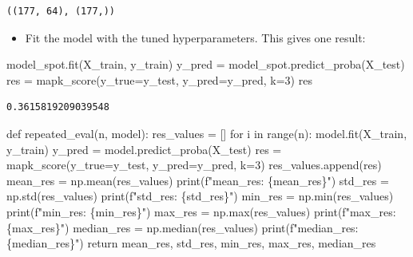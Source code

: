 \documentclass[
  letterpaper,
  DIV=11,
  numbers=noendperiod]{scrreprt}
\newenvironment{Shaded}{\begin{snugshade}}{\end{snugshade}}
\newcommand{\BuiltInTok}[1]{\textcolor[rgb]{0.00,0.23,0.31}{#1}}
\newcommand{\ControlFlowTok}[1]{\textcolor[rgb]{0.00,0.23,0.31}{#1}}
\newcommand{\DecValTok}[1]{\textcolor[rgb]{0.68,0.00,0.00}{#1}}
\newcommand{\KeywordTok}[1]{\textcolor[rgb]{0.00,0.23,0.31}{#1}}
\newcommand{\NormalTok}[1]{\textcolor[rgb]{0.00,0.23,0.31}{#1}}
\newcommand{\OperatorTok}[1]{\textcolor[rgb]{0.37,0.37,0.37}{#1}}
\newcommand{\SpecialCharTok}[1]{\textcolor[rgb]{0.37,0.37,0.37}{#1}}
\newcommand{\SpecialStringTok}[1]{\textcolor[rgb]{0.13,0.47,0.30}{#1}}
\providecommand{\tightlist}{%
  \setlength{\itemsep}{0pt}\setlength{\parskip}{0pt}}\usepackage{longtable,booktabs,array}
\begin{document}
\begin{verbatim}
((177, 64), (177,))
\end{verbatim}

\begin{itemize}
\tightlist
\item
  Fit the model with the tuned hyperparameters. This gives one result:
\end{itemize}

\begin{Shaded}
\begin{Highlighting}[]
\NormalTok{model\_spot.fit(X\_train, y\_train)}
\NormalTok{y\_pred }\OperatorTok{=}\NormalTok{ model\_spot.predict\_proba(X\_test)}
\NormalTok{res }\OperatorTok{=}\NormalTok{ mapk\_score(y\_true}\OperatorTok{=}\NormalTok{y\_test, y\_pred}\OperatorTok{=}\NormalTok{y\_pred, k}\OperatorTok{=}\DecValTok{3}\NormalTok{)}
\NormalTok{res}
\end{Highlighting}
\end{Shaded}

\begin{verbatim}
0.3615819209039548
\end{verbatim}

\begin{Shaded}
\begin{Highlighting}[]
\KeywordTok{def}\NormalTok{ repeated\_eval(n, model):}
\NormalTok{    res\_values }\OperatorTok{=}\NormalTok{ []}
    \ControlFlowTok{for}\NormalTok{ i }\KeywordTok{in} \BuiltInTok{range}\NormalTok{(n):}
\NormalTok{        model.fit(X\_train, y\_train)}
\NormalTok{        y\_pred }\OperatorTok{=}\NormalTok{ model.predict\_proba(X\_test)}
\NormalTok{        res }\OperatorTok{=}\NormalTok{ mapk\_score(y\_true}\OperatorTok{=}\NormalTok{y\_test, y\_pred}\OperatorTok{=}\NormalTok{y\_pred, k}\OperatorTok{=}\DecValTok{3}\NormalTok{)}
\NormalTok{        res\_values.append(res)}
\NormalTok{    mean\_res }\OperatorTok{=}\NormalTok{ np.mean(res\_values)}
    \BuiltInTok{print}\NormalTok{(}\SpecialStringTok{f"mean\_res: }\SpecialCharTok{\{}\NormalTok{mean\_res}\SpecialCharTok{\}}\SpecialStringTok{"}\NormalTok{)}
\NormalTok{    std\_res }\OperatorTok{=}\NormalTok{ np.std(res\_values)}
    \BuiltInTok{print}\NormalTok{(}\SpecialStringTok{f"std\_res: }\SpecialCharTok{\{}\NormalTok{std\_res}\SpecialCharTok{\}}\SpecialStringTok{"}\NormalTok{)}
\NormalTok{    min\_res }\OperatorTok{=}\NormalTok{ np.}\BuiltInTok{min}\NormalTok{(res\_values)}
    \BuiltInTok{print}\NormalTok{(}\SpecialStringTok{f"min\_res: }\SpecialCharTok{\{}\NormalTok{min\_res}\SpecialCharTok{\}}\SpecialStringTok{"}\NormalTok{)}
\NormalTok{    max\_res }\OperatorTok{=}\NormalTok{ np.}\BuiltInTok{max}\NormalTok{(res\_values)}
    \BuiltInTok{print}\NormalTok{(}\SpecialStringTok{f"max\_res: }\SpecialCharTok{\{}\NormalTok{max\_res}\SpecialCharTok{\}}\SpecialStringTok{"}\NormalTok{)}
\NormalTok{    median\_res }\OperatorTok{=}\NormalTok{ np.median(res\_values)}
    \BuiltInTok{print}\NormalTok{(}\SpecialStringTok{f"median\_res: }\SpecialCharTok{\{}\NormalTok{median\_res}\SpecialCharTok{\}}\SpecialStringTok{"}\NormalTok{)}
    \ControlFlowTok{return}\NormalTok{ mean\_res, std\_res, min\_res, max\_res, median\_res}
\end{Highlighting}
\end{Shaded}
\end{document}
